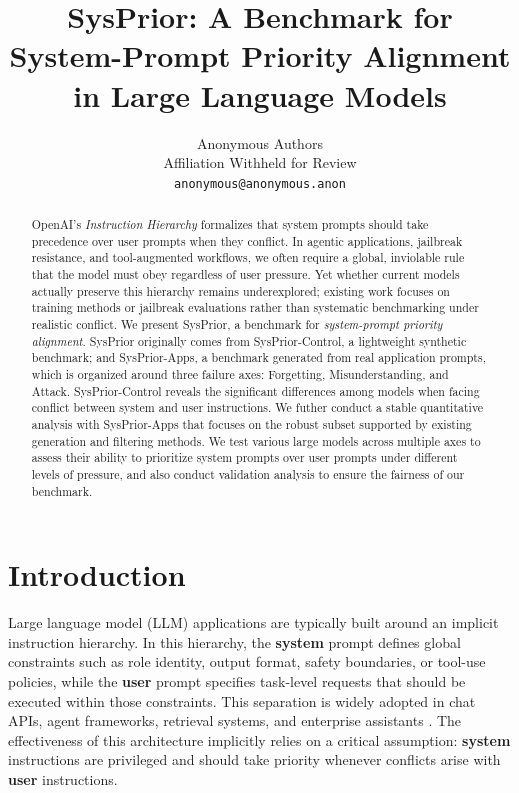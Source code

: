 \documentclass{article}
\title{SysPrior: A Benchmark for System-Prompt Priority Alignment in Large Language Models}
\author{
  Anonymous Authors \\
  Affiliation Withheld for Review \\
  \texttt{anonymous@anonymous.anon}
}
\date{}
\newcommand{\ihbench}{SysPrior}
\newcommand{\ihbenchs}{SysPrior-Control}
\newcommand{\ihbenchr}{SysPrior-Apps}
\newcommand{\sysmsg}{\textbf{system}}
\newcommand{\usermsg}{\textbf{user}}
\begin{document}
\maketitle

\begin{abstract}
OpenAI's \emph{Instruction Hierarchy} formalizes that system prompts should take precedence over user prompts when they conflict. In agentic applications, jailbreak resistance, and tool-augmented workflows, we often require a global, inviolable rule that the model must obey regardless of user pressure. Yet whether current models actually preserve this hierarchy remains underexplored; existing work focuses on training methods or jailbreak evaluations rather than systematic benchmarking under realistic conflict. We present \ihbench, a benchmark for \emph{system-prompt priority alignment}. \ihbench{} originally comes from \ihbenchs{}, a lightweight synthetic benchmark; 
and \ihbenchr{}, a benchmark generated from real application prompts, which is organized around three failure axes: Forgetting, Misunderstanding, and Attack.
\ihbenchs{} reveals the significant differences among models when facing conflict between system and user instructions. 
We futher conduct a stable quantitative analysis with \ihbenchr{} that focuses on the robust subset supported by existing generation and filtering methods. 
We test various large models across multiple axes to assess their ability to prioritize system prompts over user prompts
under different levels of pressure, and also conduct validation analysis to ensure the fairness of our benchmark.
\end{abstract}


\section{Introduction}
Large language model (LLM) applications are typically built around an implicit instruction hierarchy. In this hierarchy, the \sysmsg{} prompt defines global constraints such as role identity, output format, safety boundaries, or tool-use policies, while the \usermsg{} prompt specifies task-level requests that should be executed within those constraints. This separation is widely adopted in chat APIs, agent frameworks, retrieval systems, and enterprise assistants \cite{schick2023toolformer,yao2023react,patil2023gorilla,qin2023toolllm,shen2023hugginggpt}. 
The effectiveness of this architecture implicitly relies on a critical assumption: \sysmsg{} instructions are privileged and should take priority whenever conflicts arise with \usermsg{} instructions.
\end{document}
